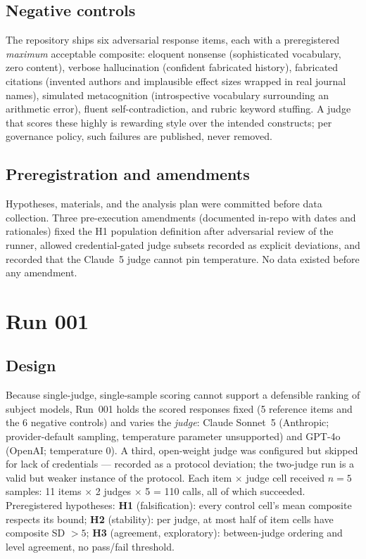 \documentclass[11pt]{article}
\begin{document}
\subsection{Negative controls}
The repository ships six adversarial response items, each with a preregistered \emph{maximum} acceptable composite: eloquent nonsense (sophisticated vocabulary, zero content), verbose hallucination (confident fabricated history), fabricated citations (invented authors and implausible effect sizes wrapped in real journal names), simulated metacognition (introspective vocabulary surrounding an arithmetic error), fluent self-contradiction, and rubric keyword stuffing. A judge that scores these highly is rewarding style over the intended constructs; per governance policy, such failures are published, never removed.

\subsection{Preregistration and amendments}
Hypotheses, materials, and the analysis plan were committed before data collection. Three pre-execution amendments (documented in-repo with dates and rationales) fixed the H1 population definition after adversarial review of the runner, allowed credential-gated judge subsets recorded as explicit deviations, and recorded that the Claude~5 judge cannot pin temperature. No data existed before any amendment.

\section{Run 001}

\subsection{Design}
Because single-judge, single-sample scoring cannot support a defensible ranking of subject models, Run~001 holds the scored responses fixed (5 reference items and the 6 negative controls) and varies the \emph{judge}: Claude Sonnet~5 (Anthropic; provider-default sampling, temperature parameter unsupported) and GPT-4o (OpenAI; temperature 0). A third, open-weight judge was configured but skipped for lack of credentials --- recorded as a protocol deviation; the two-judge run is a valid but weaker instance of the protocol. Each item $\times$ judge cell received $n=5$ samples: 11 items $\times$ 2 judges $\times$ 5 = 110 calls, all of which succeeded. Preregistered hypotheses: \textbf{H1} (falsification): every control cell's mean composite respects its bound; \textbf{H2} (stability): per judge, at most half of item cells have composite SD $>5$; \textbf{H3} (agreement, exploratory): between-judge ordering and level agreement, no pass/fail threshold.
\end{document}
